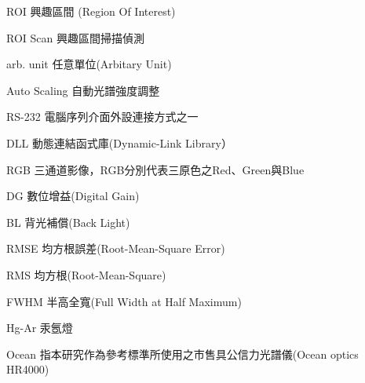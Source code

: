 
\begin{denotation}[3cm]
\vspace{-1.9cm}

\item[ROI]{
  興趣區間 (Region Of Interest)
}

\item[ROI Scan]{
  興趣區間掃描偵測
}

\item[arb. unit]{ 
	任意單位(Arbitary Unit)
}

\item[Auto Scaling]{
 自動光譜強度調整
}

\item[RS-232]{
  電腦序列介面外設連接方式之一
}

\item[DLL]{
  動態連結函式庫(Dynamic-Link Library）
}

\item[RGB]{
  三通道影像，RGB分別代表三原色之Red、Green與Blue
}

\item[DG]{
	數位增益(Digital Gain)
}

\item[BL]{
	背光補償(Back Light)
}

\item[RMSE]{
  均方根誤差(Root-Mean-Square Error)
}

\item[RMS]{
  均方根(Root-Mean-Square)
}

\item[FWHM]{
  半高全寬(Full Width at Half Maximum)
}

\item[Hg-Ar]{
  汞氬燈
}

\item[Ocean]{ 
 指本研究作為參考標準所使用之市售具公信力光譜儀(Ocean optics HR4000)
}



\end{denotation}
